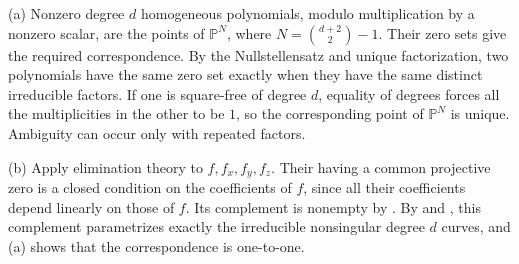 (a) Nonzero degree $d$ homogeneous polynomials, modulo multiplication by a nonzero scalar, are the points of $\mathbb{P}^N$, where $N=\binom{d+2}{2}-1$. Their zero sets give the required correspondence. By the Nullstellensatz and unique factorization, two polynomials have the same zero set exactly when they have the same distinct irreducible factors. If one is square-free of degree $d$, equality of degrees forces all the multiplicities in the other to be $1$, so the corresponding point of $\mathbb{P}^N$ is unique. Ambiguity can occur only with repeated factors.

(b) Apply elimination theory to $f,f_x,f_y,f_z$. Their having a common projective zero is a closed condition on the coefficients of $f$, since all their coefficients depend linearly on those of $f$. Its complement is nonempty by . By  and , this complement parametrizes exactly the irreducible nonsingular degree $d$ curves, and (a) shows that the correspondence is one-to-one.
